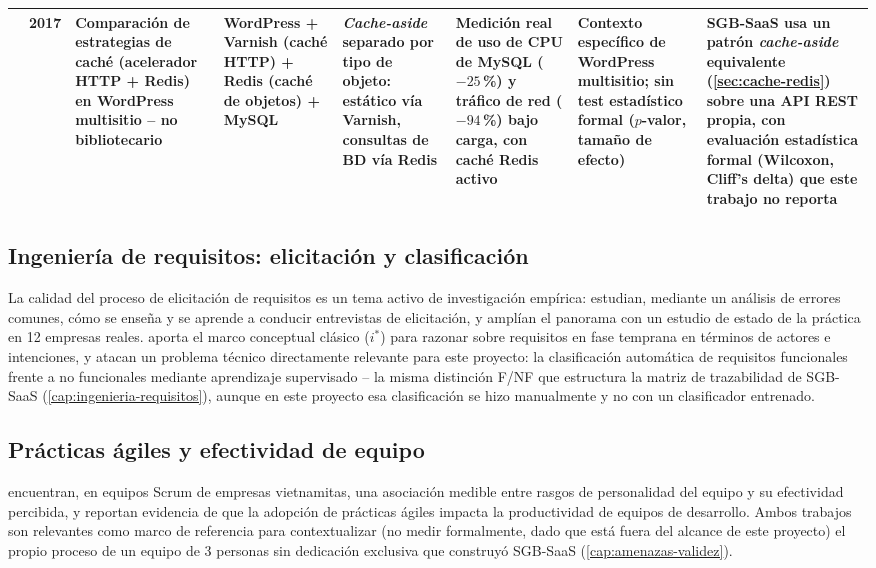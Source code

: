 \begin{landscape}
\begin{center}
\begin{longtable}{|p{2.0cm}|p{0.8cm}|p{2.5cm}|p{2.5cm}|p{2.8cm}|p{3.0cm}|p{2.8cm}|p{3.0cm}|}
\citet{kusuma2017rediscaching} & 2017 &
Comparación de estrategias de caché (acelerador HTTP + Redis) en
WordPress multisitio -- no bibliotecario &
WordPress + Varnish (caché HTTP) + Redis (caché de objetos) + MySQL &
\emph{Cache-aside} separado por tipo de objeto: estático vía Varnish,
consultas de BD vía Redis &
Medición real de uso de CPU de MySQL ($-25$\,\%) y tráfico de red
($-94$\,\%) bajo carga, con caché Redis activo &
Contexto específico de WordPress multisitio; sin test estadístico
formal ($p$-valor, tamaño de efecto) &
SGB-SaaS usa un patrón \emph{cache-aside} equivalente
(\autoref{sec:cache-redis}) sobre una API REST propia, con evaluación
estadística formal (Wilcoxon, Cliff's delta) que este trabajo no reporta \\
\hline
\end{longtable}
\end{center}
\end{landscape}

\subsection{Ingeniería de requisitos: elicitación y clasificación}

La calidad del proceso de elicitación de requisitos es un tema activo de
investigación empírica: \citet{bano2019elicitation} estudian, mediante un
análisis de errores comunes, cómo se enseña y se aprende a conducir
entrevistas de elicitación, y \citet{palomares2021elicitation} amplían el
panorama con un estudio de estado de la práctica en 12 empresas reales.
\citet{yu1997istar} aporta el marco conceptual clásico ($i^{*}$) para
razonar sobre requisitos en fase temprana en términos de actores e
intenciones, y \citet{kurtanovic2017classifying} atacan un problema
técnico directamente relevante para este proyecto: la clasificación
automática de requisitos funcionales frente a no funcionales mediante
aprendizaje supervisado -- la misma distinción F/NF que estructura la
matriz de trazabilidad de SGB-SaaS (\autoref{cap:ingenieria-requisitos}),
aunque en este proyecto esa clasificación se hizo manualmente y no con un
clasificador entrenado.

\subsection{Prácticas ágiles y efectividad de equipo}

\citet{truong2025personality} encuentran, en equipos Scrum de empresas
vietnamitas, una asociación medible entre rasgos de personalidad del
equipo y su efectividad percibida, y \citet{rahman2024agile} reportan
evidencia de que la adopción de prácticas ágiles impacta la
productividad de equipos de desarrollo. Ambos trabajos son relevantes
como marco de referencia para contextualizar (no medir formalmente,
dado que está fuera del alcance de este proyecto) el propio proceso de
un equipo de 3 personas sin dedicación exclusiva que construyó SGB-SaaS
(\autoref{cap:amenazas-validez}).

